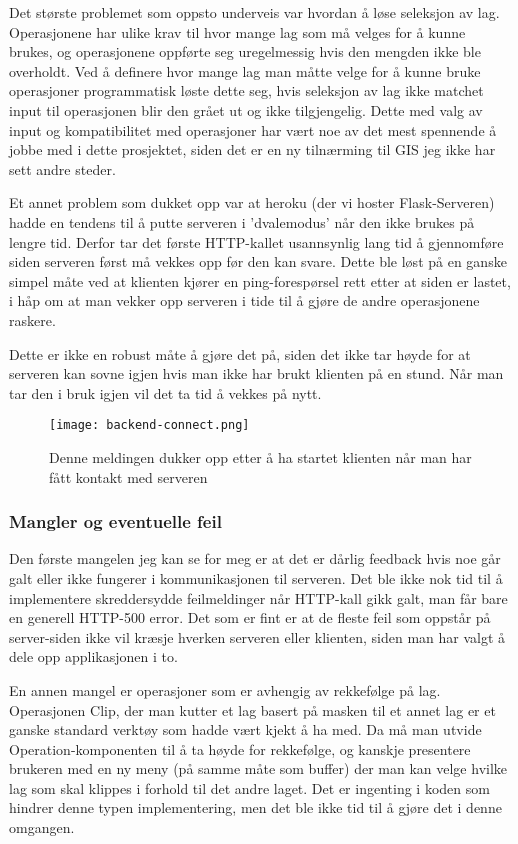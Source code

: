 Det største problemet som oppsto underveis var hvordan å løse seleksjon av lag. Operasjonene har ulike krav til hvor mange lag som må velges for å kunne brukes, og operasjonene oppførte seg uregelmessig hvis den mengden ikke ble overholdt. Ved å definere hvor mange lag man måtte velge for å kunne bruke operasjoner programmatisk løste dette seg, hvis seleksjon av lag ikke matchet input til operasjonen blir den grået ut og ikke tilgjengelig. Dette med valg av input og kompatibilitet med operasjoner har vært noe av det mest spennende å jobbe med i dette prosjektet, siden det er en ny tilnærming til GIS jeg ikke har sett andre steder. 

Et annet problem som dukket opp var at heroku (der vi hoster Flask-Serveren) hadde en tendens til å putte serveren i 'dvalemodus' når den ikke brukes på lengre tid. Derfor tar det første HTTP-kallet usannsynlig lang tid å gjennomføre siden serveren først må vekkes opp før den kan svare. Dette ble løst på en ganske simpel måte ved at klienten kjører en ping-forespørsel rett etter at siden er lastet, i håp om at man vekker opp serveren i tide til å gjøre de andre operasjonene raskere.

Dette er ikke en robust måte å gjøre det på, siden det ikke tar høyde for at serveren kan sovne igjen hvis man ikke har brukt klienten på en stund. Når man tar den i bruk igjen vil det ta tid å vekkes på nytt. 

\begin{figure}[h]
    \center
    \texttt{[image: backend-connect.png]}
    \caption{Denne meldingen dukker opp etter å ha startet klienten når man har fått kontakt med serveren}
    \label{fig:doc2}
\end{figure}

\subsubsection{Mangler og eventuelle feil}

Den første mangelen jeg kan se for meg er at det er dårlig feedback hvis noe går galt eller ikke fungerer i kommunikasjonen til serveren. Det ble ikke nok tid til å implementere skreddersydde feilmeldinger når HTTP-kall gikk galt, man får bare en generell HTTP-500 error. Det som er fint er at de fleste feil som oppstår på server-siden ikke vil kræsje hverken serveren eller klienten, siden man har valgt å dele opp applikasjonen i to. 

En annen mangel er operasjoner som er avhengig av rekkefølge på lag. Operasjonen Clip, der man kutter et lag basert på masken til et annet lag er et ganske standard verktøy som hadde vært kjekt å ha med. Da må man utvide Operation-komponenten til å ta høyde for rekkefølge, og kanskje presentere brukeren med en ny meny (på samme måte som buffer) der man kan velge hvilke lag som skal klippes i forhold til det andre laget. Det er ingenting i koden som hindrer denne typen implementering, men det ble ikke tid til å gjøre det i denne omgangen. 


